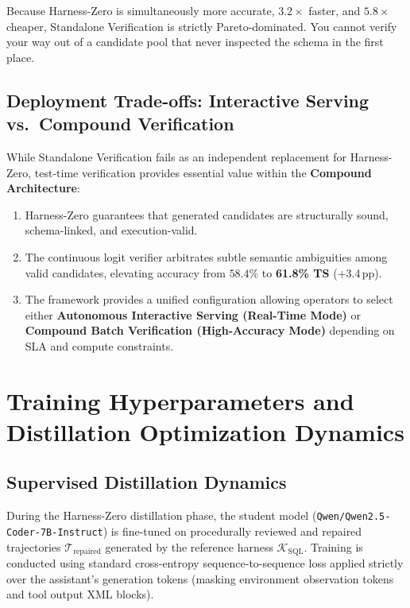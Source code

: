 \documentclass{article}
\theoremstyle{plain}
\theoremstyle{definition}
\theoremstyle{remark}
\begin{document}
Because Harness-Zero is simultaneously more accurate, $3.2\times$ faster, and $5.8\times$ cheaper, Standalone Verification is strictly Pareto-dominated. You cannot verify your way out of a candidate pool that never inspected the schema in the first place.

\subsection{Deployment Trade-offs: Interactive Serving vs.\ Compound Verification}
While Standalone Verification fails as an independent replacement for Harness-Zero, test-time verification provides essential value within the \textbf{Compound Architecture}:
\begin{enumerate}[leftmargin=*,itemsep=2pt]
    \item Harness-Zero guarantees that generated candidates are structurally sound, schema-linked, and execution-valid.
    \item The continuous logit verifier arbitrates subtle semantic ambiguities among valid candidates, elevating accuracy from $58.4\%$ to \textbf{61.8\% TS} (+3.4\,pp).
    \item The framework provides a unified configuration allowing operators to select either \textbf{Autonomous Interactive Serving (Real-Time Mode)} or \textbf{Compound Batch Verification (High-Accuracy Mode)} depending on SLA and compute constraints.
\end{enumerate}

\section{Training Hyperparameters and Distillation Optimization Dynamics}
\label{sec:appendix_training}

\subsection{Supervised Distillation Dynamics}
During the Harness-Zero distillation phase, the student model (\texttt{Qwen/Qwen2.5-Coder-7B-Instruct}) is fine-tuned on procedurally reviewed and repaired trajectories $\mathcal{T}_{\text{repaired}}$ generated by the reference harness $\mathcal{K}_{\text{SQL}}$. Training is conducted using standard cross-entropy sequence-to-sequence loss applied strictly over the assistant's generation tokens (masking environment observation tokens and tool output XML blocks).
\end{document}
